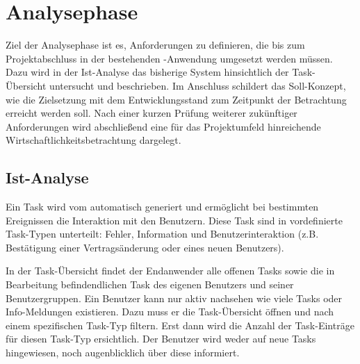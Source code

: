 \section{Analysephase}
\label{sec:Analysephase}
Ziel der Analysephase ist es, Anforderungen zu definieren, die bis zum Projektabschluss in der bestehenden -Anwendung umgesetzt werden müssen. Dazu wird in der Ist-Analyse das bisherige System hinsichtlich der Task-Übersicht
untersucht und beschrieben. Im Anschluss schildert das Soll-Konzept, wie die Zielsetzung mit dem Entwicklungsstand zum Zeitpunkt der Betrachtung erreicht werden soll. Nach einer kurzen Prüfung weiterer
zukünftiger Anforderungen wird abschließend eine für das Projektumfeld hinreichende Wirtschaftlichkeitsbetrachtung dargelegt.

\subsection{Ist-Analyse} 
\label{sub:Ist-Analyse}
Ein Task wird vom  automatisch generiert und ermöglicht bei bestimmten Ereignissen die Interaktion mit den
Benutzern. Diese Task sind in vordefinierte Task-Typen unterteilt: Fehler, Information und Benutzerinteraktion (z.B. Bestätigung
einer Vertragsänderung oder eines neuen Benutzers).

In der Task-Übersicht findet der Endanwender alle offenen Tasks sowie die in Bearbeitung befindendlichen Task des eigenen
Benutzers und seiner Benutzergruppen. Ein Benutzer kann nur aktiv nachsehen wie viele Tasks oder Info-Meldungen existieren. Dazu
muss er die Task-Übersicht öffnen und nach einem spezifischen Task-Typ filtern. Erst dann wird die Anzahl der Task-Einträge für
diesen Task-Typ ersichtlich. Der Benutzer wird weder auf neue Tasks hingewiesen, noch augenblicklich über diese informiert.
\citep[vgl.][]{Antrag}

